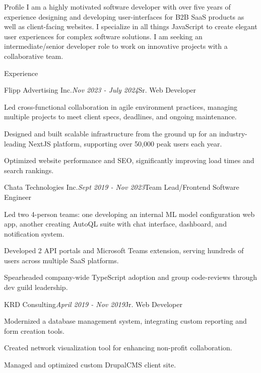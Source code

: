 \documentclass{resume}
\begin{document}
\begin{rSection}{Profile}
  I am a highly motivated software developer with over five years of experience designing and developing user-interfaces 
  for B2B SaaS products as well as client-facing websites. I specialize in all things JavaScript to create elegant user 
  experiences for complex software solutions. I am seeking an intermediate/senior developer role to work on innovative 
  projects with a collaborative team.
\end{rSection}


\begin{rSection}{Experience}

    \begin{rSubsection}{Flipp Advertising Inc.}{\em Nov 2023 - July 2024}{Sr. Web Developer}{}
      \item Led cross-functional collaboration in agile environment practices, managing multiple projects to meet client specs, deadlines, and ongoing maintenance.
      \item Designed and built scalable infrastructure from the ground up for an industry-leading NextJS platform, supporting over 50,000 peak users each year.
      \item Optimized website performance and SEO, significantly improving load times and search rankings.
    \end{rSubsection}
    \begin{rSubsection}{Chata Technologies Inc.}{\em Sept 2019 - Nov 2023}{Team Lead/Frontend Software Engineer}{}
      \item Led two 4-person teams: one developing an internal ML model configuration web app, another creating AutoQL suite with chat interface, dashboard, and notification system.
      \item Developed 2 API portals and Microsoft Teams extension, serving hundreds of users across multiple SaaS platforms.
      \item Spearheaded company-wide TypeScript adoption and group code-reviews through dev guild leadership.
    \end{rSubsection}
    \begin{rSubsection}{KRD Consulting}{\em April 2019 - Nov 2019}{Jr. Web Developer}{}
      \item Modernized a database management system, integrating custom reporting and form creation tools.
      \item Created network visualization tool for enhancing non-profit collaboration.
      \item Managed and optimized custom DrupalCMS client site.
    \end{rSubsection}
    
\end{rSection}
\end{document}
